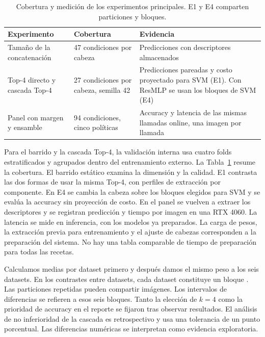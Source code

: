 \documentclass[a4paper,fleqn]{cas-sc}
\begin{document}
\begin{table}[pos=htbp]
\centering
\caption{Cobertura y medición de los experimentos principales. E1 y E4 comparten particiones y bloques.}
\label{tab:protocolo}
\small
\begin{tabular}{@{}p{}p{}p{}@{}}
\toprule
Experimento & Cobertura & Evidencia \\
\midrule
Tamaño de la concatenación & 47 condiciones por cabeza & Predicciones con descriptores almacenados \\
\addlinespace
Top-4 directo y cascada Top-4 & 27 condiciones por cabeza, semilla 42 & Predicciones pareadas y costo proyectado para SVM (E1). Con ResMLP se usan los bloques de SVM (E4) \\
\addlinespace
Panel con margen y ensamble & 94 condiciones, cinco políticas & Accuracy y latencia de las mismas llamadas online, una imagen por llamada \\
\bottomrule
\end{tabular}
\end{table}

Para el barrido y la cascada Top-4, la validación interna usa cuatro folds estratificados y agrupados dentro del entrenamiento externo. La Tabla~\ref{tab:protocolo} resume la cobertura. El barrido estático examina la dimensión y la calidad. E1 contrasta las dos formas de usar la misma Top-4, con perfiles de extracción por componente. En E4 se cambia la cabeza sobre los bloques elegidos para SVM y se evalúa la accuracy sin proyección de costo. En el panel se vuelven a extraer los descriptores y se registran predicción y tiempo por imagen en una RTX 4060. La latencia se mide en inferencia, con los modelos ya preparados. La carga de pesos, la extracción previa para entrenamiento y el ajuste de cabezas corresponden a la preparación del sistema. No hay una tabla comparable de tiempo de preparación para todas las recetas.

Calculamos medias por dataset primero y después damos el mismo peso a los seis datasets. En los contrastes entre datasets, cada dataset constituye un bloque \citep{demsar2006statistical}. Las particiones repetidas pueden compartir imágenes. Los intervalos de diferencias se refieren a esos seis bloques. Tanto la elección de $k=4$ como la prioridad de accuracy en el reporte se fijaron tras observar resultados. El análisis de no inferioridad de la cascada es retrospectivo y usa una tolerancia de un punto porcentual. Las diferencias numéricas se interpretan como evidencia exploratoria.
\end{document}
